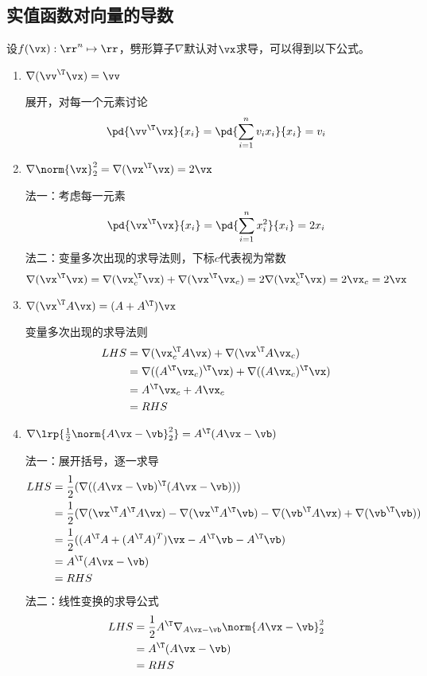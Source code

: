 \subsection{实值函数对向量的导数}
设$f(\vx):\rr^n\mapsto\rr$，劈形算子$\nabla$默认对$\vx$求导，可以得到以下公式。
\begin{enumerate}
\item $\nabla (\vv^\T\vx)=\vv$
\begin{analysis}
    展开，对每一个元素讨论
    \[\pd{\vv^\T\vx}{x_i}=\pd{\sum_{i=1}^n v_i x_i}{x_i}=v_i\]
\end{analysis}
\item $\nabla\norm{\vx}_2^2=\nabla(\vx^\T\vx)=2\vx$
\begin{analysis}
    法一：考虑每一元素
    \[\pd{\vx^\T\vx}{x_i}=\pd{\sum_{i=1}^n x_i^2}{x_i}=2x_i\]
    法二：变量多次出现的求导法则，下标$c$代表视为常数
    \[\nabla(\vx^\T\vx)=\nabla(\vx_c^\T\vx)+\nabla(\vx^\T\vx_c)=2\nabla(\vx_c^\T\vx)=2\vx_c=2\vx\]
\end{analysis}
\item $\nabla(\vx^\T A\vx)=(A+A^\T)\vx$
\begin{analysis}
    变量多次出现的求导法则
    \[\begin{aligned}
        LHS&=\nabla(\vx_c^\T A\vx)+\nabla(\vx^\T A\vx_c)\\
        &=\nabla((A^\T\vx_c)^\T\vx)+\nabla((A\vx_c)^\T \vx)\\
        &=A^\T\vx_c+A\vx_c\\
        &=RHS
    \end{aligned}\]
\end{analysis}
\item $\nabla\lrp{\frac{1}{2}\norm{A\vx-\vb}_2^2}=A^\T(A\vx-\vb)$
\begin{analysis}
    法一：展开括号，逐一求导
    \[\begin{aligned}
        LHS&=\frac{1}{2}(\nabla((A\vx-\vb)^\T(A\vx-\vb)))\\
        &=\frac{1}{2}(\nabla(\vx^\T A^\T A\vx)-\nabla(\vx^\T A^\T\vb)-\nabla(\vb^\T A\vx)+\nabla(\vb^\T\vb))\\
        &=\frac{1}{2}((A^\T A+(A^\T A)^T)\vx-A^\T\vb-A^\T\vb)\\
        &=A^\T(A\vx-\vb)\\
        &=RHS
    \end{aligned}\]
    法二：线性变换的求导公式
    \[\begin{aligned}
        LHS&=\frac{1}{2}A^\T\nabla_{A\vx-\vb}\norm{A\vx-\vb}_2^2\\
        &=A^\T(A\vx-\vb)\\
        &=RHS
    \end{aligned}\]
\end{analysis}
\end{enumerate}

